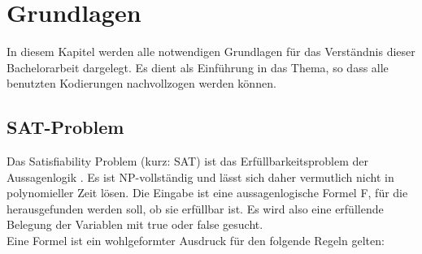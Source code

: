 \documentclass[a4,abstract=on]{scrartcl}
\newcommand*\stdsection{}
\let\stdsection\section
\renewcommand*\section{%
    \clearpage\ifodd\value{page}\else\mbox{}\clearpage\fi
    \stdsection}
\begin{document}
\section{Grundlagen}
In diesem Kapitel werden alle notwendigen Grundlagen für das Verständnis dieser Bachelorarbeit dargelegt. Es dient als Einführung in das Thema, so dass alle benutzten Kodierungen nachvollzogen werden können.
\subsection{SAT-Problem}
Das Satisfiability Problem (kurz: SAT) ist das Erfüllbarkeitsproblem der Aussagenlogik \cite[vgl.][]{sat-problem}. Es ist NP-vollständig und lässt sich daher vermutlich nicht in polynomieller Zeit lösen. Die Eingabe ist eine aussagenlogische Formel F, für die herausgefunden werden soll, ob sie erfüllbar ist. Es wird also eine erfüllende Belegung der Variablen mit true oder false gesucht.\\
Eine Formel ist ein wohlgeformter Ausdruck für den folgende Regeln gelten:
\end{document}
